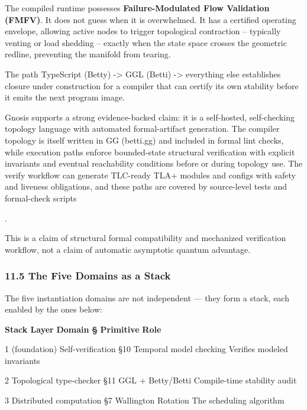 \documentclass[
]{article}
\begin{document}
The compiled runtime possesses \textbf{Failure-Modulated Flow Validation
(FMFV)}. It does not guess when it is overwhelmed. It has a certified
operating envelope, allowing active nodes to trigger topological
contraction -- typically venting or load shedding -- exactly when the
state space crosses the geometric redline, preventing the manifold from
tearing.

The path TypeScript (Betty) -\textgreater{} GGL (Betti) -\textgreater{}
everything else establishes closure under construction for a compiler
that can certify its own stability before it emits the next program
image.

Gnosis supports a strong evidence-backed claim: it is a self-hosted,
self-checking topology language with automated formal-artifact
generation. The compiler topology is itself written in GG (betti.gg) and
included in formal lint checks, while execution paths enforce
bounded-state structural verification with explicit invariants and
eventual reachability conditions before or during topology use. The
verify workflow can generate TLC-ready TLA+ modules and configs with
safety and liveness obligations, and these paths are covered by
source-level tests and formal-check scripts

.

This is a claim of structural formal compatibility and mechanized
verification workflow, not a claim of automatic asymptotic quantum
advantage.

\subsubsection{\texorpdfstring{\textbf{11.5 The Five Domains as a
Stack}}{11.5 The Five Domains as a Stack}}\label{the-five-domains-as-a-stack}

The five instantiation domains are not independent --- they form a
stack, each enabled by the ones below:

\textbf{Stack Layer} \textbar{} \textbf{Domain} \textbar{} \textbf{§}
\textbar{} \textbf{Primitive} \textbar{} \textbf{Role} \textbar{}

1 (foundation) \textbar{} Self-verification \textbar{} §10 \textbar{}
Temporal model checking \textbar{} Verifies modeled invariants
\textbar{}

2 \textbar{} Topological type-checker \textbar{} §11 \textbar{} GGL +
Betty/Betti \textbar{} Compile-time stability audit \textbar{}

3 \textbar{} Distributed computation \textbar{} §7 \textbar{} Wallington
Rotation \textbar{} The scheduling algorithm \textbar{}
\end{document}
